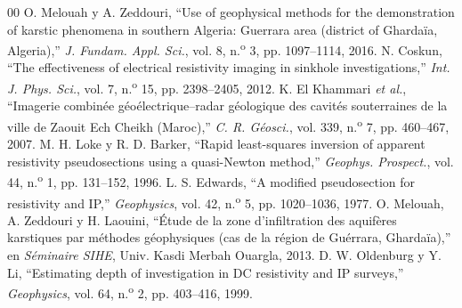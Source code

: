 \documentclass[conference]{IEEEtran}
\begin{document}
\begin{thebibliography}{00}
 O. Melouah y A. Zeddouri, ``Use of geophysical methods for the demonstration of karstic phenomena in southern Algeria: Guerrara area (district of Gharda\"ia, Algeria),'' \textit{J. Fundam. Appl. Sci.}, vol. 8, n.\textsuperscript{o} 3, pp. 1097--1114, 2016.
 N. Coskun, ``The effectiveness of electrical resistivity imaging in sinkhole investigations,'' \textit{Int. J. Phys. Sci.}, vol. 7, n.\textsuperscript{o} 15, pp. 2398--2405, 2012.
 K. El Khammari \textit{et al.}, ``Imagerie combin\'ee g\'eo\'electrique--radar g\'eologique des cavit\'es souterraines de la ville de Zaouit Ech Cheikh (Maroc),'' \textit{C. R. G\'eosci.}, vol. 339, n.\textsuperscript{o} 7, pp. 460--467, 2007.
 M. H. Loke y R. D. Barker, ``Rapid least-squares inversion of apparent resistivity pseudosections using a quasi-Newton method,'' \textit{Geophys. Prospect.}, vol. 44, n.\textsuperscript{o} 1, pp. 131--152, 1996.
 L. S. Edwards, ``A modified pseudosection for resistivity and IP,'' \textit{Geophysics}, vol. 42, n.\textsuperscript{o} 5, pp. 1020--1036, 1977.
 O. Melouah, A. Zeddouri y H. Laouini, ``\'Etude de la zone d'infiltration des aquif\`eres karstiques par m\'ethodes g\'eophysiques (cas de la r\'egion de Gu\'errara, Gharda\"ia),'' en \textit{S\'eminaire SIHE}, Univ. Kasdi Merbah Ouargla, 2013.
 D. W. Oldenburg y Y. Li, ``Estimating depth of investigation in DC resistivity and IP surveys,'' \textit{Geophysics}, vol. 64, n.\textsuperscript{o} 2, pp. 403--416, 1999.
\end{thebibliography}
\end{document}
